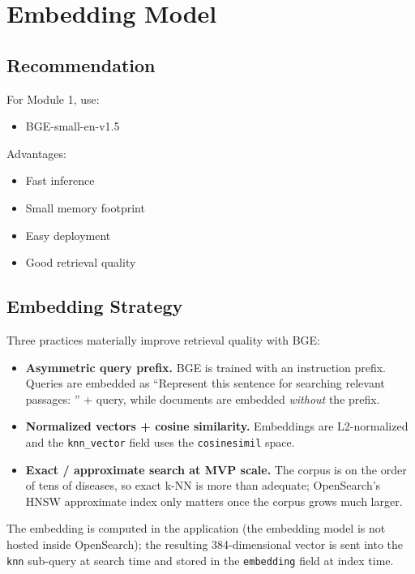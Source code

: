 \documentclass[11pt,a4paper]{article}
\begin{document}
\section{Embedding Model}

\subsection{Recommendation}

For Module 1, use:

\begin{itemize}
    \item BGE-small-en-v1.5
\end{itemize}

Advantages:

\begin{itemize}
    \item Fast inference
    \item Small memory footprint
    \item Easy deployment
    \item Good retrieval quality
\end{itemize}

\subsection{Embedding Strategy}

Three practices materially improve retrieval quality with BGE:

\begin{itemize}
    \item \textbf{Asymmetric query prefix.} BGE is trained with an instruction
          prefix. Queries are embedded as ``Represent this sentence for
          searching relevant passages: '' $+$ query, while documents are
          embedded \emph{without} the prefix.
    \item \textbf{Normalized vectors + cosine similarity.} Embeddings are
          L2-normalized and the \texttt{knn\_vector} field uses the
          \texttt{cosinesimil} space.
    \item \textbf{Exact / approximate search at MVP scale.} The corpus is on the
          order of tens of diseases, so exact k-NN is more than adequate;
          OpenSearch's HNSW approximate index only matters once the corpus grows
          much larger.
\end{itemize}

The embedding is computed in the application (the embedding model is not hosted
inside OpenSearch); the resulting 384-dimensional vector is sent into the
\texttt{knn} sub-query at search time and stored in the \texttt{embedding}
field at index time.
\end{document}
